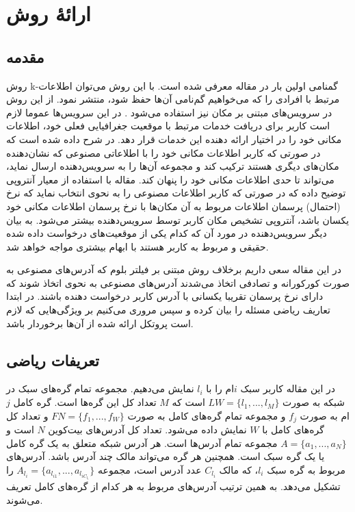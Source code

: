 \chapter{ارائهٔ روش}
\label{proposed}
\section{مقدمه} 
روش k-گمنامی اولین بار در مقاله \cite{Sweeney2002} معرفی شده است. با این روش می‌توان اطلاعات مرتبط با افرادی  را که می‌خواهیم گم‌نامی آن‌ها حفظ شود، منتشر نمود. از این روش در سرویس‌های مبتنی بر مکان نیز استفاده می‌شود \cite{Niu2015} . در این سرویس‌ها عموما لازم است کاربر برای دریافت خدمات مرتبط با موقعیت جغرافیایی فعلی خود، اطلاعات مکانی خود را در اختیار ارائه دهنده این خدمات قرار دهد. در  \cite{Niu2015} شرح داده شده است که در صورتی که کاربر اطلاعات مکانی خود را با اطلاعاتی مصنوعی که نشان‌دهنده مکان‌های دیگری هستند ترکیب کند و مجموعه آن‌ها را به سرویس‌دهنده ارسال نماید، می‌تواند تا حدی اطلاعات مکانی خود را پنهان کند. مقاله \cite{Niu2015} با استفاده از معیار آنتروپی توضیح داده که در صورتی که کاربر اطلاعات مصنوعی را به نحوی انتخاب نماید که نرخ (احتمال) پرسمان اطلاعات مربوط به آن مکان‌ها با نرخ پرسمان اطلاعات مکانی خود یکسان باشد، آنتروپی تشخیص مکان کاربر توسط سرویس‌دهنده بیشتر می‌شود. به بیان دیگر سرویس‌دهنده در مورد آن که کدام یکی از موقعیت‌های درخواست داده شده حقیقی و مربوط به کاربر هستند با ابهام بیشتری مواجه خواهد شد.

در این مقاله سعی داریم برخلاف روش مبتنی بر فیلتر بلوم که آدرس‌های مصنوعی به صورت کورکورانه و تصادفی اتخاذ می‌شدند آدرس‌های مصنوعی به نحوی اتخاذ شوند که دارای نرخ پرسمان تقریبا یکسانی با آدرس کاربر درخواست دهنده باشند. در ابتدا تعاریف ریاضی مسئله را بیان کرده و سپس مروری می‌کنیم بر ویژگی‌هایی که لازم است پروتکل ارائه شده از آن‌ها برخوردار باشد.



\section{تعریفات ریاضی}




در این مقاله کاربر سبک $i$ام را با $l_i$ نمایش می‌دهیم. مجموعه تمام گره‌های سبک در شبکه به صورت $LW = \{l_1,..., l_M\}$ است که $M$ تعداد کل این گره‌ها است. گره‌ کامل $j$ام به صورت $f_j$ و مجموعه تمام گره‌های کامل به صورت $FN=\{f_1,..., f_W\}$ و تعداد کل گره‌های کامل با $W$ نمایش داده می‌شود. تعداد کل آدرس‌های بیت‌کوین $N$ است و $A=\{a_1,..., a_N\}$ مجموعه تمام آدرس‌ها است. هر آدرس شبکه متعلق به یک گره کامل یا یک گره سبک است. همچنین هر گره می‌تواند مالک چند آدرس باشد. آدرس‌های مربوط به گره سبک $l_i$، که مالک
$C_{l_i}$ 
عدد آدرس است، مجموعه 
$A_{l_i}=\{a_{l_{i1}},... , a_{l_{iC_{l_i}}}\}$
را تشکیل می‌دهد. به همین ترتیب آدرس‌های مربوط به هر کدام از گره‌های کامل تعریف می‌شوند.

